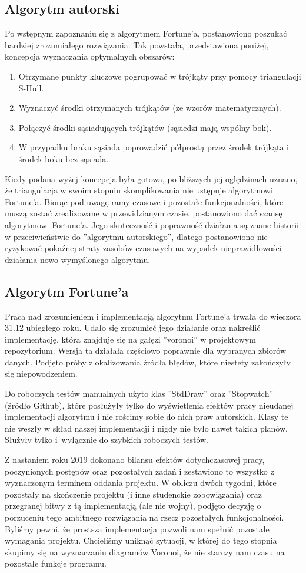 \documentclass[a4paper,11pt]{article}
\begin{document}
\subsection{Algorytm autorski}
Po wstępnym zapoznaniu się z algorytmem Fortune'a, postanowiono poszukać bardziej zrozumiałego rozwiązania.
Tak powstała, przedstawiona poniżej, koncepcja wyznaczania optymalnych obszarów:
\begin{enumerate}
\item Otrzymane punkty kluczowe pogrupować w trójkąty przy pomocy triangulacji S-Hull.
\item Wyznaczyć środki otrzymanych trójkątów (ze wzorów matematycznych).
\item Połączyć środki sąsiadujących trójkątów (sąsiedzi mają wspólny bok).
\item W przypadku braku sąsiada poprowadzić półprostą przez środek trójkąta i środek boku bez sąsiada.
\end{enumerate}
Kiedy podana wyżej koncepcja była gotowa, po bliższych jej oględzinach uznano, że triangulacja w swoim stopniu skomplikowania nie ustępuje algorytmowi Fortune'a.
Biorąc pod uwagę ramy czasowe i pozostałe funkcjonalności, które muszą zostać zrealizowane w przewidzianym czasie, postanowiono dać szansę algorytmowi Fortune'a. Jego skuteczność i poprawność działania są znane historii w przeciwieństwie do ''algorytmu autorskiego'', dlatego postanowiono nie ryzykować pokaźnej straty zasobów czasowych na wypadek nieprawidłowości działania nowo wymyślonego algorytmu.
\subsection{Algorytm Fortune'a}
Praca nad zrozumieniem i implementacją algorytmu Fortune'a trwała do wieczora 31.12 ubiegłego roku.
Udało się zrozumieć jego działanie oraz nakreślić implementację, która znajduje się na gałęzi ''voronoi'' w projektowym repozytorium. Wersja ta działała częściowo poprawnie dla wybranych zbiorów danych. Podjęto próby zlokalizowania źródła błędów, które niestety zakończyły się niepowodzeniem.

Do roboczych testów manualnych użyto klas ''StdDraw'' oraz ''Stopwatch'' (źródło Github), które posłużyły tylko do wyświetlenia efektów pracy nieudanej implementacji algorytmu i nie rościmy sobie do nich praw autorskich. Klasy te nie weszły w skład naszej implementacji i nigdy nie było nawet takich planów. Służyły tylko i~wyłącznie do szybkich roboczych testów.

Z nastaniem roku 2019 dokonano bilansu efektów dotychczasowej pracy, poczynionych postępów oraz pozostałych zadań i zestawiono to wszystko z wyznaczonym terminem oddania projektu. W obliczu dwóch tygodni, które pozostały na skończenie projektu (i inne studenckie zobowiązania) oraz przegranej bitwy z tą implementacją (ale nie wojny), podjęto decyzję o porzuceniu tego ambitnego rozwiązania na rzecz pozostałych funkcjonalności. Byliśmy pewni, że prostsza implementacja pozwoli nam spełnić pozostałe wymagania projektu. Chcieliśmy uniknąć sytuacji, w której do tego stopnia skupimy się na wyznaczaniu diagramów Voronoi, że nie starczy nam czasu na pozostałe funkcje programu.
\end{document}
